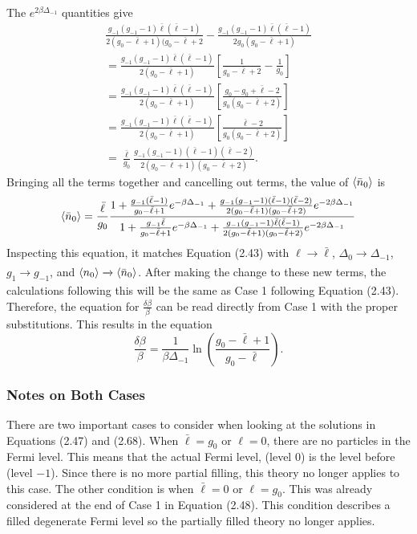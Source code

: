 The $e^{2\beta\Delta_{-1}}$ quantities give
\begin{gather}
    \frac{g_{-1}(g_{-1}-1)\bar{\ell}(\bar{\ell}-1)}{2(g_0-\bar{\ell}+1)(g_0-\bar{\ell}+2}-\frac{g_{-1}(g_{-1}-1)\bar{\ell}(\bar{\ell}-1)}{2g_0(g_0-\bar{\ell}+1)}\nonumber\\
    =\frac{g_{-1}(g_{-1}-1)\bar{\ell}(\bar{\ell}-1)}{2(g_0-\bar{\ell}+1)}[\frac{1}{g_0-\bar{\ell}+2}-\frac{1}{g_0}]\nonumber\\
    =\frac{g_{-1}(g_{-1}-1)\bar{\ell}(\bar{\ell}-1)}{2(g_0-\bar{\ell}+1)}[\frac{g_0-g_0+\bar{\ell}-2}{g_0(g_0-\bar{\ell}+2)}]\nonumber\\
    =\frac{g_{-1}(g_{-1}-1)\bar{\ell}(\bar{\ell}-1)}{2(g_0-\bar{\ell}+1)}[\frac{\bar{\ell}-2}{g_0(g_0-\bar{\ell}+2)}]\nonumber\\
    =\frac{\bar{\ell}}{g_0}\frac{g_{-1}(g_{-1}-1)(\bar{\ell}-1)(\bar{\ell}-2)}{2(g_0-\bar{\ell}+1)(g_0-\bar{\ell}+2)}.
\end{gather}
Bringing all the terms together and cancelling out terms, the value of $\left<{\bar{n}_0}\right>$ is 
\begin{equation}
    \left<{\bar{n}_0}\right>=\frac{\bar{\ell}}{g_0}\frac{1+\frac{g_{-1}(\bar{\ell}-1)}{g_0-\bar{\ell}+1}e^{-\beta\Delta_{-1}}+\frac{g_{-1}(g_{-1}-1)(\bar{\ell}-1)(\bar{\ell}-2)}{2(g_0-\bar{\ell}+1)(g_0-\bar{\ell}+2)}e^{-2\beta\Delta_{-1}}}{1+\frac{g_{-1}\bar{\ell}}{g_0-\bar{\ell}+1}e^{-\beta\Delta_{-1}}+\frac{g_{-1}(g_{-1}-1)\bar{\ell}(\bar{\ell}-1)}{2(g_0-\bar{\ell}+1)(g_0-\bar{\ell}+2)}e^{-2\beta\Delta_{-1}}}
\end{equation}
Inspecting this equation, it matches Equation (2.43) with $\ell\xrightarrow[]{}\bar{\ell}$, $\Delta_0\xrightarrow[]{}\Delta_{-1}$, $g_1\xrightarrow[]{}g_{-1}$, and $\left<{n_0}\right>\xrightarrow[]{}\left<{\bar{n}_0}\right>$. After making the change to these new terms, the calculations following this will be the same as Case 1 following Equation (2.43). Therefore, the equation for $\frac{\delta\beta}{\beta}$ can be read directly from Case 1 with the proper substitutions. This results in the equation 
\begin{equation}
    \frac{\delta\beta}{\beta}=\frac{1}{\beta\Delta_{-1}}\ln(\frac{g_0-\bar{\ell}+1}{g_0-\bar{\ell}}).
\end{equation}
\subsubsection{Notes on Both Cases}
There are two important cases to consider when looking at the solutions in Equations (2.47) and (2.68). When $\bar{\ell}=g_0$ or $\ell=0$, there are no particles in the Fermi level. This means that the actual Fermi level, (level $0$) is the level before (level $-1$). Since there is no more partial filling, this theory no longer applies to this case. The other condition is when $\bar{\ell}=0$ or $\ell=g_0$. This was already considered at the end of Case 1 in Equation (2.48). This condition describes a filled degenerate Fermi level so the partially filled theory no longer applies. 